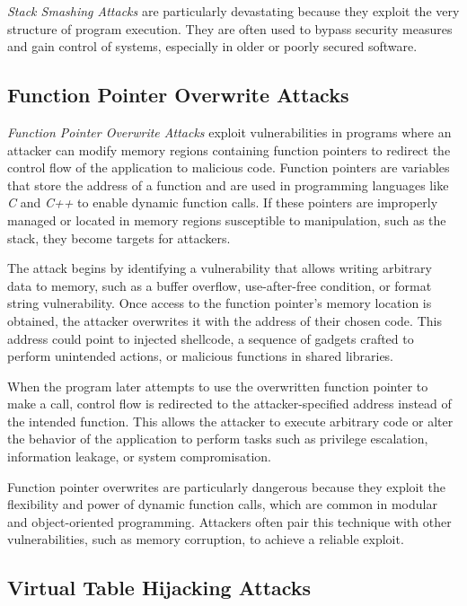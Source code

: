 \textit{Stack Smashing Attacks} are particularly devastating because they exploit
the very structure of program execution. They are often used to bypass security
measures and gain control of systems, especially in older or poorly secured software.

\subsection{Function Pointer Overwrite Attacks}
\label{subsec:background_pointeroverwrite}

\textit{Function Pointer Overwrite Attacks} exploit vulnerabilities in programs where
an attacker can modify memory regions containing function pointers to redirect the
control flow of the application to malicious code. Function pointers are
variables that store the address of a function and are used in programming
languages like \textit{C} and \textit{C++} to enable dynamic function calls. If these
pointers are improperly managed or located in memory regions susceptible to manipulation,
such as the stack, they become targets for attackers.

The attack begins by identifying a vulnerability that allows writing arbitrary data
to memory, such as a buffer overflow, use-after-free condition, or format string
vulnerability. Once access to the function pointer's memory location is obtained,
the attacker overwrites it with the address of their chosen code. This address could
point to injected shellcode, a sequence of gadgets crafted to perform unintended
actions, or malicious functions in shared libraries.

When the program later attempts to use the overwritten function pointer to make a
call, control flow is redirected to the attacker-specified address instead of
the intended function. This allows the attacker to execute arbitrary code or alter
the behavior of the application to perform tasks such as privilege escalation,
information leakage, or system compromisation.

Function pointer overwrites are particularly dangerous because they exploit the flexibility
and power of dynamic function calls, which are common in modular and object-oriented
programming. Attackers often pair this technique with other vulnerabilities,
such as memory corruption, to achieve a reliable exploit.

\subsection{Virtual Table Hijacking Attacks}
\label{subsec:background_virtualtable}

